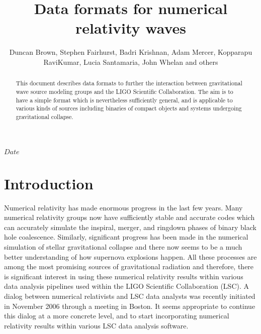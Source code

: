 \documentclass[10pt]{ligodcc}
\title{Data formats for numerical relativity waves}
\author{Duncan Brown, Stephen Fairhurst, Badri Krishnan, Adam Mercer,
Kopparapu RaviKumar, Lucia Santamaria, John Whelan and others}
\begin{document}
\maketitle


\tableofcontents

\newcommand{\Ys}{{{}^{-s}Y}}
\newcommand{\Ytwo}{{{}^{-2}Y}}
\newcommand{\tens}[1]{\tensor{#1}}
\newcommand{\xhat}{\vec{e}_x}
\newcommand{\yhat}{\vec{e}_y}
\newcommand{\zhat}{\vec{e}_z}
\newcommand{\ihat}{\vec{e}_i}
\newcommand{\jhat}{\vec{e}_j}
\newcommand{\rhat}{\vec{e}_{r}}
\newcommand{\iotahat}{\vec{e}_{\iota}}
\newcommand{\phihat}{\vec{e}_{\phi}}
\newcommand{\eplus}{\tens{e}_+}
\newcommand{\ecross}{\tens{e}_\times}

\RCS $Date$
\date{\RCSDate}

\begin{abstract}
  This document describes data formats to further the interaction
  between gravitational wave source modeling groups and the LIGO
  Scientific Collaboration. The aim is to have a simple format which
  is nevertheless sufficiently general, and is applicable to various
  kinds of sources including binaries of compact objects and systems
  undergoing gravitational collapse.
\end{abstract}

\section{Introduction}
\label{sec:intro}

Numerical relativity has made enormous progress in the last few years.
Many numerical relativity groups now have sufficiently stable and
accurate codes which can accurately simulate the inspiral, merger, and
ringdown phases of binary black hole coalescence.  Similarly,
significant progress has been made in the numerical simulation of
stellar gravitational collapse and there now seems to be a much better
understanding of how supernova explosions happen.  All these processes
are among the most promising sources of gravitational radiation and
therefore, there is significant interest in using these numerical
relativity results within various data analysis pipelines used within
the LIGO Scientific Collaboration (LSC).  A dialog between numerical
relativists and LSC data analysts was recently initiated in November
2006 through a meeting in Boston. It seems appropriate to continue
this dialog at a more concrete level, and to start incorporating
numerical relativity results within various LSC data analysis
software.
\end{document}
